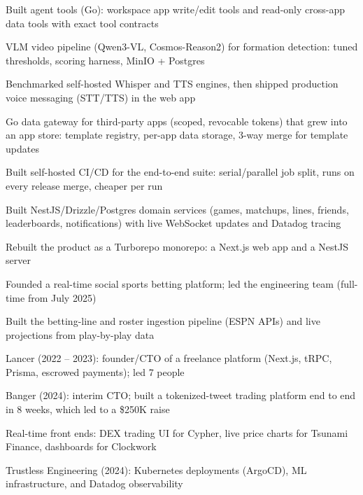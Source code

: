 \documentclass[print]{jack-resume}
\begin{document}
\begin{tightemize}
    \item Built agent tools (Go): workspace app write/edit tools and read-only cross-app data tools with exact tool contracts
    \item VLM video pipeline (Qwen3-VL, Cosmos-Reason2) for formation detection: tuned thresholds, scoring harness, MinIO + Postgres
    \item Benchmarked self-hosted Whisper and TTS engines, then shipped production voice messaging (STT/TTS) in the web app
    \item Go data gateway for third-party apps (scoped, revocable tokens) that grew into an app store: template registry, per-app data storage, 3-way merge for template updates
    \item Built self-hosted CI/CD for the end-to-end suite: serial/parallel job split, runs on every release merge, cheaper per run
\end{tightemize}
\sectionsep

\begin{tightemize}
    \item Built NestJS/Drizzle/Postgres domain services (games, matchups, lines, friends, leaderboards, notifications) with live WebSocket updates and Datadog tracing
    \item Rebuilt the product as a Turborepo monorepo: a Next.js web app and a NestJS server
    \item Founded a real-time social sports betting platform; led the engineering team (full-time from July 2025)
    \item Built the betting-line and roster ingestion pipeline (ESPN APIs) and live projections from play-by-play data
\end{tightemize}
\sectionsep

\begin{tightemize}
    \item Lancer (2022 -- 2023): founder/CTO of a freelance platform (Next.js, tRPC, Prisma, escrowed payments); led 7 people
    \item Banger (2024): interim CTO; built a tokenized-tweet trading platform end to end in 8 weeks, which led to a \$250K raise
    \item Real-time front ends: DEX trading UI for Cypher, live price charts for Tsunami Finance, dashboards for Clockwork
    \item Trustless Engineering (2024): Kubernetes deployments (ArgoCD), ML infrastructure, and Datadog observability
\end{tightemize}
\sectionsep
\end{document}
